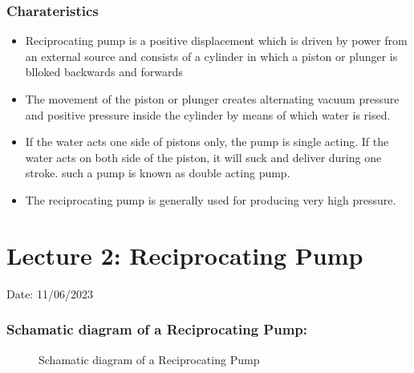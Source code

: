 \documentclass{article}
\begin{document}
\subsubsection*{Charateristics}
\begin{itemize}
	\item Reciprocating pump is a positive displacement which is driven by power from an external source and consists of a cylinder in which a piston or plunger is blloked backwards and forwards
	\item The movement of the piston or plunger creates alternating vacuum pressure and positive pressure inside the cylinder by means of which water is rised.
	\item If the water acts one side of pistons only, the pump is single acting. If the water acts on both side of the piston, it will suck and deliver during one stroke. such a pump is known as double acting pump.
	\item The reciprocating pump is generally used for producing very high pressure.
	
\end{itemize}

\hrulefill

\section{Lecture 2: Reciprocating Pump}
\hfill Date: 11/06/2023

\subsubsection*{Schamatic diagram of a Reciprocating Pump:}
\begin{figure}[!ht]
  \centering
  \caption{Schamatic diagram of a Reciprocating Pump}
  \label{fig:reciprocating_pump}
\end{figure}
\end{document}
